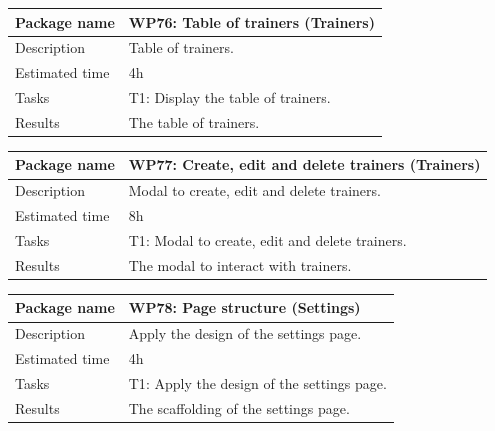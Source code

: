 \documentclass[a4paper, 12pt, oneside]{book}
\begin{document}
\vspace*{16pt}
\begin{tabularx}{\textwidth}{| l | X |}
	\hline
	\rowcolor{rowColor}
	{\semibf Package name}   & {\semibf WP76}: Table of trainers (Trainers) \\
	\hline
	{\semibf Description}    & Table of trainers.                           \\
	\hline
	\rowcolor{rowColor}
	{\semibf Estimated time} & 4h                                           \\
	\hline
	{\semibf Tasks}          & {\semibf T1}: Display the table of trainers. \\
	\hline
	\rowcolor{rowColor}
	{\semibf Results}        & The table of trainers.                       \\
	\hline
\end{tabularx}
\vspace*{16pt}
\begin{tabularx}{\textwidth}{| l | X |}
	\hline
	\rowcolor{rowColor}
	{\semibf Package name}   & {\semibf WP77}: Create, edit and delete trainers (Trainers) \\
	\hline
	{\semibf Description}    & Modal to create, edit and delete trainers.                  \\
	\hline
	\rowcolor{rowColor}
	{\semibf Estimated time} & 8h                                                          \\
	\hline
	{\semibf Tasks}          & {\semibf T1}: Modal to create, edit and delete trainers.    \\
	\hline
	\rowcolor{rowColor}
	{\semibf Results}        & The modal to interact with trainers.                        \\
	\hline
\end{tabularx}
\vspace*{16pt}
\begin{tabularx}{\textwidth}{| l | X |}
	\hline
	\rowcolor{rowColor}
	{\semibf Package name}   & {\semibf WP78}: Page structure (Settings)            \\
	\hline
	{\semibf Description}    & Apply the design of the settings page.               \\
	\hline
	\rowcolor{rowColor}
	{\semibf Estimated time} & 4h                                                   \\
	\hline
	{\semibf Tasks}          & {\semibf T1}: Apply the design of the settings page. \\
	\hline
	\rowcolor{rowColor}
	{\semibf Results}        & The scaffolding of the settings page.                \\
	\hline
\end{tabularx}
\end{document}
